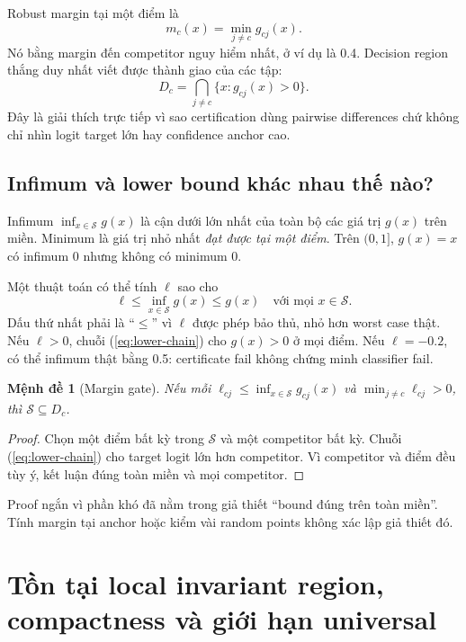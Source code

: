 \documentclass[11pt,a4paper]{article}
\newcommand{\Sset}{\mathcal S}
\newtheorem{proposition}{Mệnh đề}[section]
\theoremstyle{definition}
\begin{document}
Robust margin tại một điểm là
\begin{equation}
m_c(x)=\min_{j\ne c}g_{cj}(x).
\end{equation}
Nó bằng margin đến competitor nguy hiểm nhất, ở ví dụ là 0.4. Decision
region thắng duy nhất viết được thành giao của các tập:
\begin{equation}
D_c=\bigcap_{j\ne c}\{x:g_{cj}(x)>0\}.
\end{equation}
Đây là giải thích trực tiếp vì sao certification dùng pairwise differences
chứ không chỉ nhìn logit target lớn hay confidence anchor cao.

\subsection{Infimum và lower bound khác nhau thế nào?}
Infimum $\inf_{x\in\Sset}g(x)$ là cận dưới lớn nhất của toàn bộ các giá trị
$g(x)$ trên miền. Minimum là giá trị nhỏ nhất \emph{đạt được tại một điểm}.
Trên $(0,1]$, $g(x)=x$ có infimum 0 nhưng không có minimum 0.

Một thuật toán có thể tính $\ell$ sao cho
\begin{equation}
\ell\le\inf_{x\in\Sset}g(x)\le g(x)\quad\text{với mọi }x\in\Sset.
\label{eq:lower-chain}
\end{equation}
Dấu thứ nhất phải là ``$\le$'' vì $\ell$ được phép bảo thủ, nhỏ hơn worst
case thật. Nếu $\ell>0$, chuỗi (\ref{eq:lower-chain}) cho $g(x)>0$ ở mọi
điểm. Nếu $\ell=-0.2$, có thể infimum thật bằng 0.5: certificate fail
không chứng minh classifier fail.

\begin{proposition}[Margin gate]
Nếu mỗi $\ell_{cj}\le\inf_{x\in\Sset}g_{cj}(x)$ và
$\min_{j\ne c}\ell_{cj}>0$, thì $\Sset\subseteq D_c$.
\end{proposition}
\begin{proof}
Chọn một điểm bất kỳ trong $\Sset$ và một competitor bất kỳ. Chuỗi
(\ref{eq:lower-chain}) cho target logit lớn hơn competitor. Vì competitor
và điểm đều tùy ý, kết luận đúng toàn miền và mọi competitor.
\end{proof}
Proof ngắn vì phần khó đã nằm trong giả thiết ``bound đúng trên toàn miền''.
Tính margin tại anchor hoặc kiểm vài random points không xác lập giả thiết đó.

\section{Tồn tại local invariant region, compactness và giới hạn universal}
\end{document}
